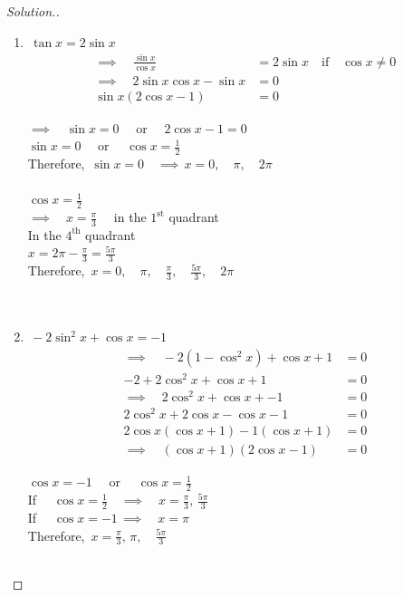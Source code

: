 \documentclass[11pt,a4paper]{article}
\theoremstyle{definition}
\newenvironment{solution}
  {\renewcommand{\qedsymbol}{}\begin{proof}[\textit{Solution}.]}
  {\end{proof}}
\begin{document}
\begin{solution}

\begin{enumerate}
\item[i.] $\, \tan x = 2\sin x$
\begin{align*}
\implies \quad  \frac{\sin x }{\cos x} & = 2\sin x\quad  \text{if}\quad  \cos x \neq 0\\
\implies \quad  2\sin x\cos x - \sin x &  = 0\\
\sin x ( 2\cos x - 1 ) & = 0
\end{align*}

$\implies\quad  \sin x = 0\quad $ or $\quad  2\cos x - 1 = 0$\\

$\sin x = 0\quad $  or $\quad  \cos x = \frac{1}{2}$\\

Therefore, $\, \sin x = 0 \quad \implies\, x = 0, \quad  \pi, \quad  2\pi$\\\\

$\cos x = \frac{1}{2}$\\
$\implies \quad  x = \frac{\pi}{3}\quad $ in the $1^{\text{st}}$ quadrant\\

In the $4^{\text{th}}$ quadrant\\
$x = 2\pi - \frac{\pi}{3} = \frac{5\pi}{3}$\\


Therefore, $\, x = 0, \quad  \pi, \quad  \frac{\pi}{3}, \quad  \frac{5\pi}{3}, \quad  2\pi$\\\\\\





\item[ii.] $\, -2\sin^2x + \cos x = -1$
\begin{align*}
\implies \quad  -2(1 - \cos^2x ) + \cos x + 1 & = 0\\
-2 + 2\cos^2x + \cos x +  1 & = 0\\
\implies\quad  2\cos^2x + \cos x + - 1 & = 0\\
2\cos^2x + 2\cos x - \cos x - 1 & = 0\\
2\cos x (\cos x + 1) - 1(\cos x + 1) & = 0\\
\implies\quad  (\cos x + 1)(2\cos x - 1) & = 0
\end{align*}

$\cos x = -1\quad $ or $\quad  \cos x = \frac{1}{2}$\\

If $\quad  \cos x = \frac{1}{2}\quad \implies\quad  x = \frac{\pi}{3}, \, \frac{5\pi}{3}$\\

If $\quad  \cos x = -1\, \implies\quad  x = \pi$\\

Therefore, $\,x = \frac{\pi}{3}, \, \pi,\quad  \frac{5\pi}{3}$\\\\ 
\end{enumerate}
\end{solution}
\end{document}
